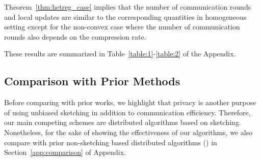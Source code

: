 \documentclass{article}
\begin{document}

Theorem~\ref{thm:hetreg_case} implies that the number of communication rounds and local updates are similar to the corresponding quantities in homogeneous setting except for the non-convex case where the number of communication rounds also depends on the compression rate.

These results are summarized in Table~\ref{table:1}-\ref{table:2} of the Appendix.


\vspace{-0.05in}
\subsection{Comparison with Prior Methods} 

Before comparing with prior works, we highlight that privacy is another purpose of using unbiased sketching in addition to communication efficiency. 
Therefore, our main competing schemes are distributed algorithms based on sketching. 
Nonetheless, for the sake of showing the effectiveness of our algorithms, we also compare with prior non-sketching based distributed algorithms (\cite{karimireddy2019scaffold,basu2019qsparse,reisizadeh2020fedpaq,haddadpour2020federated}) in Section~\ref{app:comparison} of Appendix.
\end{document}
